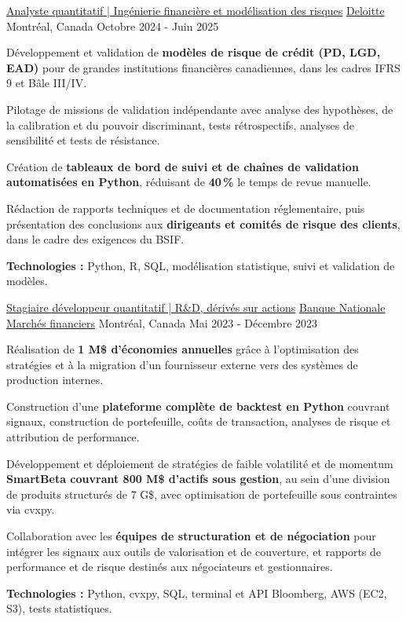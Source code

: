 \begin{cventries}
  \cventry
    {\href{https://www.deloitte.com/ca/fr.html}{Analyste quantitatif | Ingénierie financière et modélisation des risques}}
    {\href{https://www.deloitte.com/ca/fr.html}{Deloitte}}
    {Montréal, Canada}
    {Octobre 2024 - Juin 2025}
    {
      \begin{cvitems}
        \item{Développement et validation de \textbf{modèles de risque de crédit (PD, LGD, EAD)} pour de grandes institutions financières canadiennes, dans les cadres IFRS 9 et Bâle III/IV.}
        \item{Pilotage de missions de validation indépendante avec analyse des hypothèses, de la calibration et du pouvoir discriminant, tests rétrospectifs, analyses de sensibilité et tests de résistance.}
        \item{Création de \textbf{tableaux de bord de suivi et de chaînes de validation automatisées en Python}, réduisant de \textbf{40\,\%} le temps de revue manuelle.}
        \item{Rédaction de rapports techniques et de documentation réglementaire, puis présentation des conclusions aux \textbf{dirigeants et comités de risque des clients}, dans le cadre des exigences du BSIF.}
        \item{\textbf{Technologies :} Python, R, SQL, modélisation statistique, suivi et validation de modèles.}
      \end{cvitems}
    }

  \cventry
    {\href{https://www.nbc.ca/fr/marchesdescapitaux.html}{Stagiaire développeur quantitatif | R\&D, dérivés sur actions}}
    {\href{https://www.nbc.ca/fr/marchesdescapitaux.html}{Banque Nationale Marchés financiers}}
    {Montréal, Canada}
    {Mai 2023 - Décembre 2023}
    {
      \begin{cvitems}
        \item{Réalisation de \textbf{1 M\$ d'économies annuelles} grâce à l'optimisation des stratégies et à la migration d'un fournisseur externe vers des systèmes de production internes.}
        \item{Construction d'une \textbf{plateforme complète de backtest en Python} couvrant signaux, construction de portefeuille, coûts de transaction, analyses de risque et attribution de performance.}
        \item{Développement et déploiement de stratégies de faible volatilité et de momentum \textbf{SmartBeta couvrant 800 M\$ d'actifs sous gestion}, au sein d'une division de produits structurés de 7 G\$, avec optimisation de portefeuille sous contraintes via cvxpy.}
        \item{Collaboration avec les \textbf{équipes de structuration et de négociation} pour intégrer les signaux aux outils de valorisation et de couverture, et rapports de performance et de risque destinés aux négociateurs et gestionnaires.}
        \item{\textbf{Technologies :} Python, cvxpy, SQL, terminal et API Bloomberg, AWS (EC2, S3), tests statistiques.}
      \end{cvitems}
    }


\end{cventries}

